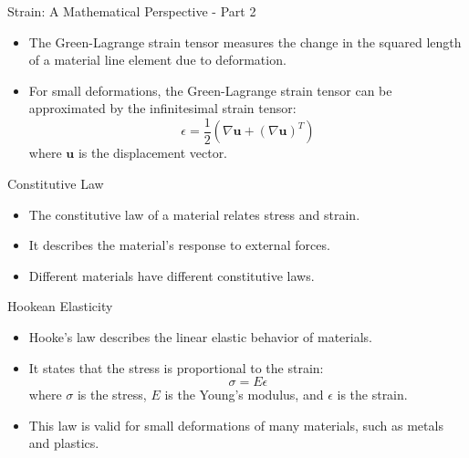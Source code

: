 \documentclass{beamer}
\begin{document}
\begin{frame}{Strain: A Mathematical Perspective - Part 2}
    \begin{itemize}
        \item The Green-Lagrange strain tensor measures the change in the squared length of a material line element due to deformation.
        \item For small deformations, the Green-Lagrange strain tensor can be approximated by the infinitesimal strain tensor:
        \begin{equation*}
        \epsilon = \frac{1}{2} (\nabla \mathbf{u} + (\nabla \mathbf{u})^T)
        \end{equation*}
        where $\mathbf{u}$ is the displacement vector.
    \end{itemize}
\end{frame}

\begin{frame}{Constitutive Law}
    \begin{itemize}
        \item The constitutive law of a material relates stress and strain.
        \item It describes the material's response to external forces.
        \item Different materials have different constitutive laws.
    \end{itemize}
\end{frame}

\begin{frame}{Hookean Elasticity}
    \begin{itemize}
        \item Hooke's law describes the linear elastic behavior of materials.
        \item It states that the stress is proportional to the strain:
        \begin{equation*}
            \sigma = E \epsilon
        \end{equation*}
        where $\sigma$ is the stress, $E$ is the Young's modulus, and $\epsilon$ is the strain.
        \item This law is valid for small deformations of many materials, such as metals and plastics.
    \end{itemize}
\end{frame}
\end{document}
